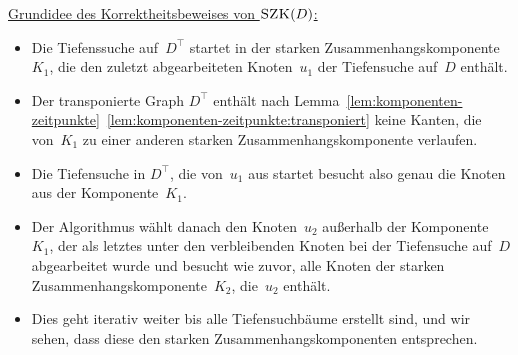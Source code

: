 \begin{bem}
\underline{Grundidee des Korrektheitsbeweises von $\mathop{\text{\textsc{SZK}}}(D)$:}
\begin{itemize}
 \item Die Tiefenssuche auf~$D^\top$ startet in der starken Zusammenhangskomponente~$K_1$, die den zuletzt abgearbeiteten Knoten~$u_1$ der Tiefensuche auf~$D$ enthält.
 \item Der transponierte Graph $D^\top$ enthält nach Lemma~\ref{lem:komponenten-zeitpunkte}~\ref{lem:komponenten-zeitpunkte:transponiert} keine Kanten, die von~$K_1$ zu einer anderen starken Zusammenhangskomponente verlaufen.
 \item Die Tiefensuche in $D^\top$, die von~$u_1$ aus startet besucht also genau die Knoten aus der Komponente~$K_1$.
 \item Der Algorithmus wählt danach den Knoten~$u_2$ außerhalb der Komponente~$K_1$, der als letztes unter den verbleibenden Knoten bei der Tiefensuche auf~$D$ abgearbeitet wurde und besucht wie zuvor, alle Knoten der starken Zusammenhangskomponente~$K_2$, die~$u_2$ enthält.
 \item Dies geht iterativ weiter bis alle Tiefensuchbäume erstellt sind, und wir sehen, dass diese den starken Zusammenhangskomponenten entsprechen.
\end{itemize}
\end{bem}



